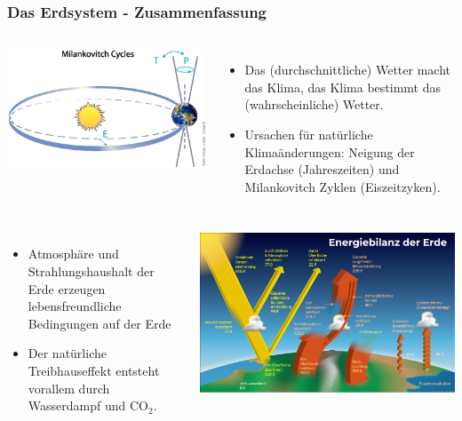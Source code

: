 \begin{frame}
	\frametitle{Das Erdsystem - Zusammenfassung}
	\begin{columns}
			\includegraphics[width=0.9\linewidth]{bilder/milankovitch_IPCC2007_AR4.png}
			\begin{itemize}
				\item Das (durchschnittliche) Wetter macht das Klima, das Klima bestimmt das (wahrscheinliche) Wetter.
				\item Ursachen für natürliche Klimaänderungen: Neigung der Erdachse (Jahreszeiten) und Milankovitch Zyklen (Eiszeitzyken).
			\end{itemize}
	\end{columns}
	\begin{columns}
		\column{0.7\linewidth}
			\begin{itemize}
				\item Atmosphäre und Strahlungshaushalt der Erde erzeugen lebensfreundliche Bedingungen auf der Erde
				\item Der natürliche Treibhauseffekt entsteht vorallem durch Wasserdampf und CO$_2$.
			\end{itemize}
		\column{0.3\linewidth}
			\includegraphics[width=0.9\linewidth]{bilder/Energiebilanz_der_Erde_NASA.png}

\end{columns}
\end{frame}
